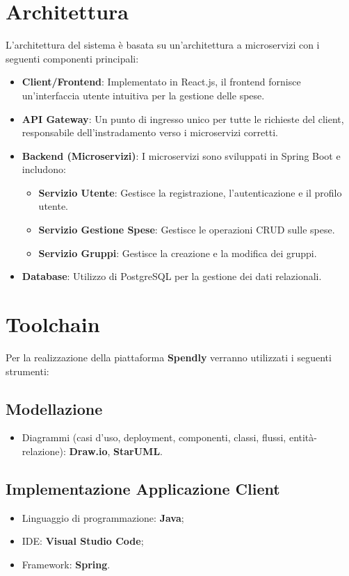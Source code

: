 \section{Architettura}
    L'architettura del sistema è basata su un'architettura a microservizi con i seguenti componenti principali:
    \begin{itemize}
        \item \textbf{Client/Frontend}: Implementato in React.js, il frontend fornisce un'interfaccia utente intuitiva per la gestione delle spese.
        \item \textbf{API Gateway}: Un punto di ingresso unico per tutte le richieste del client, responsabile dell'instradamento verso i microservizi corretti.
        \item \textbf{Backend (Microservizi)}: I microservizi sono sviluppati in Spring Boot e includono:
        \begin{itemize}
            \item \textbf{Servizio Utente}: Gestisce la registrazione, l'autenticazione e il profilo utente.
            \item \textbf{Servizio Gestione Spese}: Gestisce le operazioni CRUD sulle spese.
            \item \textbf{Servizio Gruppi}: Gestisce la creazione e la modifica dei gruppi.
        \end{itemize}
        \item \textbf{Database}: Utilizzo di PostgreSQL per la gestione dei dati relazionali.
    \end{itemize}

\section{Toolchain}
Per la realizzazione della piattaforma \textbf{Spendly} verranno utilizzati i seguenti strumenti:

\subsection*{Modellazione}
\begin{itemize}
    \item Diagrammi (casi d'uso, deployment, componenti, classi, flussi, entità-relazione): \textbf{Draw.io}, \textbf{StarUML}.
\end{itemize}

\subsection*{Implementazione Applicazione Client}
\begin{itemize}
    \item Linguaggio di programmazione: \textbf{Java};
    \item IDE: \textbf{Visual Studio Code};
    \item Framework: \textbf{Spring}.
\end{itemize}

